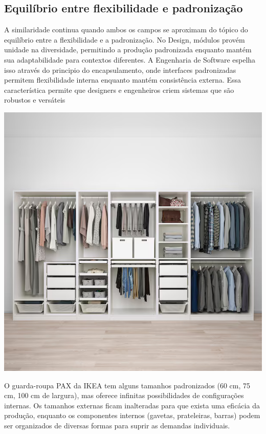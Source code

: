 \documentclass[12pt]{article}
\begin{document}
\subsection{Equilíbrio entre flexibilidade e padronização}

A similaridade continua quando ambos os campos se aproximam do tópico do equilíbrio entre a flexibilidade e a padronização. No Design, módulos provém unidade na diversidade, permitindo a produção padronizada enquanto mantém sua adaptabilidade para contextos diferentes. A Engenharia de Software espelha isso através do principio do encapsulamento, onde interfaces padronizadas permitem flexibilidade interna enquanto mantém consistência externa. Essa característica permite que designers e engenheiros criem sistemas que são robustos e versáteis
\vspace{20px}

\noindent
\begin{minipage}{0.4\textwidth}
\includegraphics[width=1\textwidth]{pax-ikea.png}
\end{minipage}
\begin{minipage}{0.6\textwidth}\raggedright
O guarda-roupa PAX da IKEA tem alguns tamanhos padronizados (60 cm, 75 cm, 100 cm de largura), mas oferece infinitas possibilidades de configurações internas. Os tamanhos externas ficam inalteradas para que exista uma eficácia da produção, enquanto os componentes internos (gavetas, prateleiras, barras) podem ser organizados de diversas formas para suprir as demandas individuais.
\end{minipage}
\end{document}
